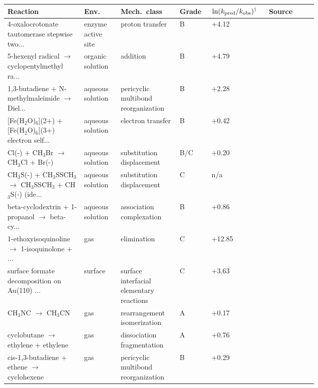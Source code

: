 \begin{table}[htbp]
\centering
\noindent\scriptsize\setlength{\tabcolsep}{2pt}\begin{tabular}{@{}p{0.205\linewidth}p{0.085\linewidth}p{0.125\linewidth}p{0.05\linewidth}p{0.12\linewidth}p{0.135\linewidth}@{}}
\toprule
Reaction & Env. & Mech.\ class & Grade & \(\ln(k_{\rm pred}/k_{\rm obs})\)\(^{\dagger}\) & Source \\
\midrule
4-oxalocrotonate tautomerase stepwise two... & enzyme active site & proton transfer & B & +4.12 & \citep{ba_ruizpernia20094otqmmm} \\
5-hexenyl radical $\to$ cyclopentylmethyl ra... & organic solution & addition & B & +4.79 & \citep{ba_gansauer2013hexenyl,ba_chatgilialoglu1981hexenylexperiment} \\
1,3-butadiene + N-methylmaleimide $\to$ Diel... & aqueous solution & pericyclic multibond reorganization & B & +2.28 & \citep{ba_gui2026lipred,ba_gui2025lipreddataset} \\
{}[Fe(H$_2$O)$_6$](2+) + [Fe(H$_2$O)$_6$](3+) electron self... & aqueous solution & electron transfer & B & +0.42 & \citep{ba_koczorbenda2023et,ba_rossorustad2000feet} \\
Cl(-) + CH$_3$Br $\to$ CH$_3$Cl + Br(-) & aqueous solution & substitution displacement & B/C & +0.20 & \citep{ba_campeggio2020,ba_bathgate1959} \\
CH$_3$S(-) + CH$_3$SSCH$_3$ $\to$ CH$_3$SSCH$_3$ + CH$_3$S(-) (ide... & aqueous solution & substitution displacement & C & n/a & \citep{ba_campeggio2020} \\
beta-cyclodextrin + 1-propanol $\to$ beta-cy... & aqueous solution & association complexation & B & +0.86 & \citep{ba_tangchang2018betacd,ba_betacdhistoricalkineticsaggregate} \\
1-ethoxyisoquinoline $\to$ 1-isoquinolone + ... & gas & elimination & C & +12.85 & \citep{ba_mahmoud2023elimination,ba_alawaditaylor1986elimination} \\
surface formate decomposition on Au(110) ... & surface & surface interfacial elementary reactions & C & +3.63 & \citep{ba_monkhorst2022formateaucu} \\
CH$_3$NC $\to$ CH$_3$CN & gas & rearrangement isomerization & A & +0.17 & \citep{ba_nguyen2018,ba_schneider1962nist} \\
cyclobutane $\to$ ethylene + ethylene & gas & dissociation fragmentation & A & +0.76 & \citep{ba_sirjean2006,ba_genaux1953nist} \\
cis-1,3-butadiene + ethene $\to$ cyclohexene & gas & pericyclic multibond reorganization & B & +0.29 & \citep{ba_mcpdftopesf2025} \\

\end{tabular}
\end{table}
